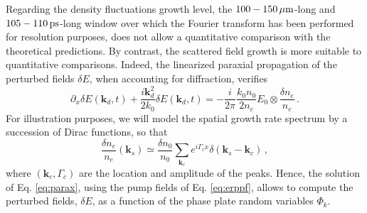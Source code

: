 \documentclass[
 reprint,
 superscriptaddress,
 amsmath,amssymb,
 aps,
]{revtex4-1}
\begin{document}
Regarding the density fluctuations  growth level, 
the $100-150\,\rm\mu m$-long  and $105-110\,\rm ps$-long window over which the Fourier transform has been performed for resolution purposes, does not allow a quantitative comparison with the theoretical predictions.
By contrast, the scattered field  growth is more suitable to quantitative comparisons. Indeed, the linearized paraxial propagation of the perturbed fields $\delta E$, when accounting for diffraction, verifies 
\begin{equation}
    \partial_x \delta E(\mathbf{k}_d,t) + \frac{i\mathbf{k}_d^2}{2k_0}\delta E(\mathbf{k}_d,t) = -\frac{i}{2\pi}\frac{k_0n_0}{2n_c}E_0\otimes \frac{\delta n_e}{n_e} \, . \label{eq:parax}
\end{equation}
For illustration purposes, we will model the spatial growth rate spectrum by a succession of Dirac functions, so that 
\begin{equation}
     \frac{\delta n_e}{n_e}(\mathbf{k}_s) \simeq  \frac{\delta n_0}{n_0} \sum_{\mathbf{k}_c} e^{i\Gamma_{c} x} \delta(\mathbf{k}_s-\mathbf{k}_c)\, , \label{eq:dnparax}
\end{equation}
where $(\mathbf{k}_c,\Gamma_{c})$ are the location and amplitude of the peaks. 
Hence,
the solution of Eq. \eqref{eq:parax}, using the pump fields of Eq. \eqref{eq:erppf},  allows to compute the perturbed fields, $\delta E$, as a function of the phase plate random variables $\Phi_k$. 
\end{document}
